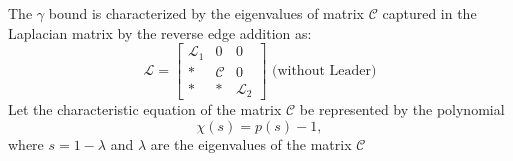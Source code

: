 \begin{subframe}
	The $\gamma$ bound is characterized by the eigenvalues of matrix $\mathcal{C}$ captured in the Laplacian matrix by the reverse edge addition as:\\
	$$\mathcal{L}=\begin{bmatrix}
		\mathcal{L}_1 & 0 & 0 \\
		* & \mathcal{C} & 0 \\
		* & * & \mathcal{L}_2
	\end{bmatrix} \text{ (without Leader)}$$ 
	\vspace{0.2cm}
	Let the characteristic equation of the matrix $\mathcal{C}$ be represented by the polynomial $$\chi(s)=p(s)-1,$$ where $s=1-\lambda$ and $\lambda$ are the eigenvalues of the matrix $\mathcal{C}$\\
	\vspace{-0.2cm}

\end{subframe}
